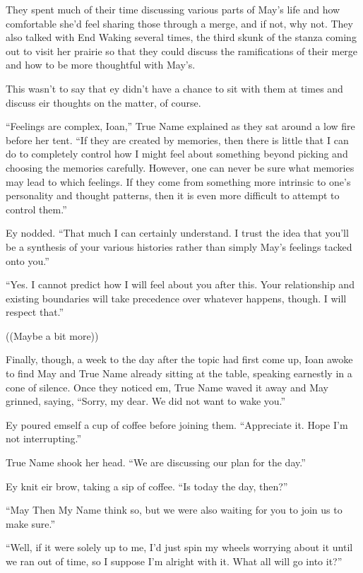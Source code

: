 They spent much of their time discussing various parts of May's life and how comfortable she'd feel sharing those through a merge, and if not, why not. They also talked with End Waking several times, the third skunk of the stanza coming out to visit her prairie so that they could discuss the ramifications of their merge and how to be more thoughtful with May's.

This wasn't to say that ey didn't have a chance to sit with them at times and discuss eir thoughts on the matter, of course.

``Feelings are complex, Ioan,'' True Name explained as they sat around a low fire before her tent. ``If they are created by memories, then there is little that I can do to completely control how I might feel about something beyond picking and choosing the memories carefully. However, one can never be sure what memories may lead to which feelings. If they come from something more intrinsic to one's personality and thought patterns, then it is even more difficult to attempt to control them.''

Ey nodded. ``That much I can certainly understand. I trust the idea that you'll be a synthesis of your various histories rather than simply May's feelings tacked onto you.''

``Yes. I cannot predict how I will feel about you after this. Your relationship and existing boundaries will take precedence over whatever happens, though. I will respect that.''

((Maybe a bit more))

Finally, though, a week to the day after the topic had first come up, Ioan awoke to find May and True Name already sitting at the table, speaking earnestly in a cone of silence. Once they noticed em, True Name waved it away and May grinned, saying, ``Sorry, my dear. We did not want to wake you.''

Ey poured emself a cup of coffee before joining them. ``Appreciate it. Hope I'm not interrupting.''

True Name shook her head. ``We are discussing our plan for the day.''

Ey knit eir brow, taking a sip of coffee. ``Is today the day, then?''

``May Then My Name think so, but we were also waiting for you to join us to make sure.''

``Well, if it were solely up to me, I'd just spin my wheels worrying about it until we ran out of time, so I suppose I'm alright with it. What all will go into it?''

